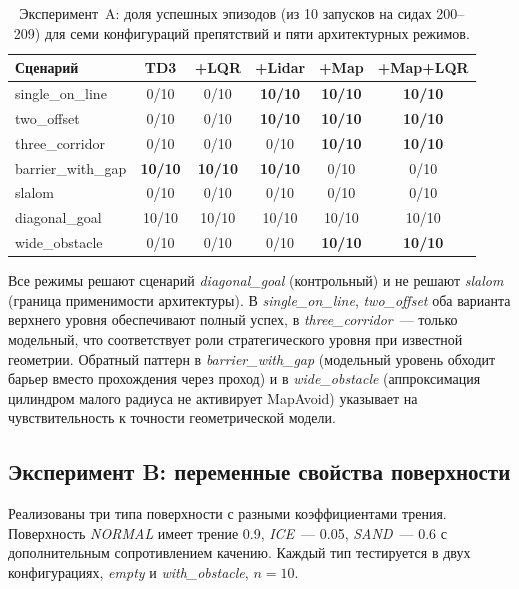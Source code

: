 \documentclass[11pt]{article}
\begin{document}
\begin{table}[h]
\begin{center}
\begin{tabular}{lccccc}
\toprule
Сценарий & TD3 & +LQR & +Lidar & +Map & +Map+LQR \\
\midrule
single\_on\_line     & 0/10 & 0/10 & \textbf{10/10} & \textbf{10/10} & \textbf{10/10} \\
two\_offset         & 0/10 & 0/10 & \textbf{10/10} & \textbf{10/10} & \textbf{10/10} \\
three\_corridor     & 0/10 & 0/10 & 0/10           & \textbf{10/10} & \textbf{10/10} \\
barrier\_with\_gap  & \textbf{10/10} & \textbf{10/10} & \textbf{10/10} & 0/10 & 0/10 \\
slalom              & 0/10 & 0/10 & 0/10 & 0/10           & 0/10           \\
diagonal\_goal      & 10/10 & 10/10 & 10/10 & 10/10        & 10/10         \\
wide\_obstacle      & 0/10 & 0/10 & 0/10 & \textbf{10/10} & \textbf{10/10} \\
\bottomrule
\end{tabular}
\caption{Эксперимент~A: доля успешных эпизодов (из 10 запусков на сидах
200--209) для семи конфигураций препятствий и пяти архитектурных режимов.
}
\label{tab:exp_a}
\end{center}
\end{table}

Все режимы решают сценарий \emph{diagonal\_goal} (контрольный) и не решают \emph{slalom} (граница применимости архитектуры). В \emph{single\_on\_line}, \emph{two\_offset} оба варианта верхнего уровня обеспечивают полный успех, в \emph{three\_corridor}~--- только модельный, что соответствует роли стратегического уровня при известной геометрии. Обратный паттерн в \emph{barrier\_with\_gap} (модельный уровень обходит барьер вместо прохождения через проход) и в \emph{wide\_obstacle} (аппроксимация цилиндром малого радиуса не активирует MapAvoid) указывает на чувствительность к точности геометрической модели.


\subsection{Эксперимент B: переменные свойства поверхности}
\label{sec:exp_b}

Реализованы три типа поверхности с разными коэффициентами трения. Поверхность \emph{NORMAL} имеет трение 0.9, \emph{ICE}~--- 0.05, \emph{SAND}~--- 0.6 с дополнительным сопротивлением качению. Каждый тип тестируется в двух конфигурациях, \emph{empty} и \emph{with\_obstacle}, $n = 10$.
\end{document}
